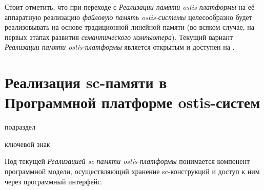 Стоит отметить, что при переходе с \textit{Реализации памяти ostis-платформы} на её аппаратную реализацию \textit{файловую память ostis-системы} целесообразно будет реализовывать на основе традиционной линейной памяти (во всяком случае, на первых этапах развития \textit{семантического компьютера}). Текущий вариант \textit{Реализации памяти ostis-платформы} является открытым и доступен на .

\section{Реализация sc-памяти в Программной платформе ostis-систем}
\label{sec_soft_platform_sc_storage}

\begin{SCn}

\begin{scnrelfromlist}{подраздел}
\end{scnrelfromlist}

\begin{scnrelfromlist}{ключевой знак}
	\begin{scnindent}
	\end{scnindent}
\end{scnrelfromlist}

\end{SCn}

\bigskip

Под текущей \textit{Реализацией sc-памяти ostis-платформы} понимается компонент программной модели, осуществляющий хранение sc-конструкций и доступ к ним через программный интерфейс.

